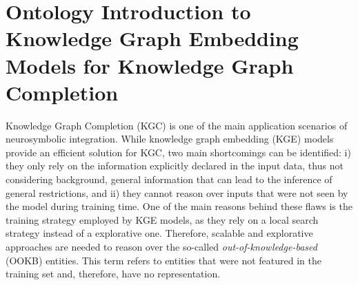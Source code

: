 \section{Ontology Introduction to Knowledge Graph Embedding Models for Knowledge Graph Completion} \label{4_sec:ontointro_kgc}


Knowledge Graph Completion (KGC) is one of the main application scenarios of neurosymbolic integration. While knowledge graph embedding (KGE) models provide an efficient solution for KGC, two main shortcomings can be identified: i) they only rely on the information explicitly declared in the input data, thus not considering background, general information that can lead to the inference of general restrictions, and ii) they cannot reason over inputs that were not seen by the model during training time. One of the main reasons behind these flaws is the training strategy employed by KGE models, as they rely on a local search strategy instead of a explorative one. Therefore, scalable and explorative approaches are needed to reason over the so-called \textit{out-of-knowledge-based} (OOKB) entities. This term refers to entities that were not featured in the training set and, therefore, have no representation. 

